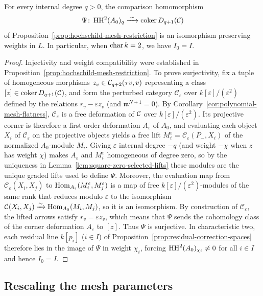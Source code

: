 \begin{proposition}
\label{prop:full-hochschild-comparison}
For every internal degree $q>0$, the comparison homomorphism
\[
  \Psi\colon\operatorname{HH}^2(A_0)_q\xrightarrow{\;\sim\;}\operatorname{coker}D_{q+1}(\mathcal C)
\]
of Proposition~\ref{prop:hochschild-mesh-restriction} is an isomorphism preserving weights in $L$. In particular, when $\operatorname{char} k=2$, we have $I_0=I$.
\end{proposition}
\begin{proof}
Injectivity and weight compatibility were established in Proposition~\ref{prop:hochschild-mesh-restriction}. To prove surjectivity, fix a tuple of homogeneous morphisms $z_v\in\mathcal C_{q+2}(\tau v,v)$ representing a class $[z]\in\operatorname{coker}D_{q+1}(\mathcal C)$, and form the perturbed category $\mathcal C_\varepsilon$ over $k[\varepsilon]/(\varepsilon^2)$ defined by the relations $r_v-\varepsilon z_v$ (and $\mathfrak m^{N+1}=0$). By Corollary~\ref{cor:polynomial-mesh-flatness}, $\mathcal C_\varepsilon$ is a free deformation of $\mathcal C$ over $k[\varepsilon]/(\varepsilon^2)$. Its projective corner is therefore a first-order deformation $A_\varepsilon$ of $A_0$, and evaluating each object $X_i$ of $\mathcal C_\varepsilon$ on the projective objects yields a free lift $M_i^\varepsilon=\mathcal C_\varepsilon(P_-,X_i)$ of the normalized $A_0$-module $M_i$. Giving $\varepsilon$ internal degree $-q$ (and weight $-\chi$ when $z$ has weight $\chi$) makes $A_\varepsilon$ and $M_i^\varepsilon$ homogeneous of degree zero, so by the uniqueness in Lemma~\ref{lem:square-zero-selected-lifts} these modules are the unique graded lifts used to define $\Psi$. Moreover, the evaluation map from $\mathcal C_\varepsilon(X_i,X_j)$ to $\operatorname{Hom}_{A_\varepsilon}(M_i^\varepsilon,M_j^\varepsilon)$ is a map of free $k[\varepsilon]/(\varepsilon^2)$-modules of the same rank that reduces modulo $\varepsilon$ to the isomorphism $\mathcal C(X_i,X_j)\xrightarrow{\sim}\operatorname{Hom}_{A_0}(M_i,M_j)$, so it is an isomorphism. By construction of $\mathcal C_\varepsilon$, the lifted arrows satisfy $r_v=\varepsilon z_v$, which means that $\Psi$ sends the cohomology class of the corner deformation $A_\varepsilon$ to $[z]$. Thus $\Psi$ is surjective. In characteristic two, each residual line $k[p_i]$ ($i\in I$) of Proposition~\ref{prop:residual-correction-spaces} therefore lies in the image of $\Psi$ in weight $\chi_i$, forcing $\operatorname{HH}^2(A_0)_{\chi_i}\ne0$ for all $i\in I$ and hence $I_0=I$.
\end{proof}

\subsection{Rescaling the mesh parameters}

